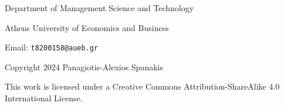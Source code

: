 



\begin{titlepage}
    
\end{titlepage}

\clearpage
\vspace*{\fill}
\begin{minipage}{.9\textwidth}
    \centerline{Department of Management Science and Technology}
    \centerline{Athens University of Economics and Business}
    \centerline{Email: {\tt t8200158@aueb.gr}}
    \vspace{1cm}
    \centerline{Copyright 2024 Panagiotis-Alexios Spanakis}
    \centerline{This work is licensed under a Creative Commons Attribution-ShareAlike 4.0 International License.}
\end{minipage}
\vfill %
\clearpage


\tableofcontents
\clearpage

\listoffigures
\clearpage

\listoftables
\clearpage




\clearpage

\pagestyle{fancy}
\fancyhf{}
\fancyhead[L]{\thepage\ / \pageref{LastPage}}
\fancyhead[R]{\it \rightmark}







%



% 



